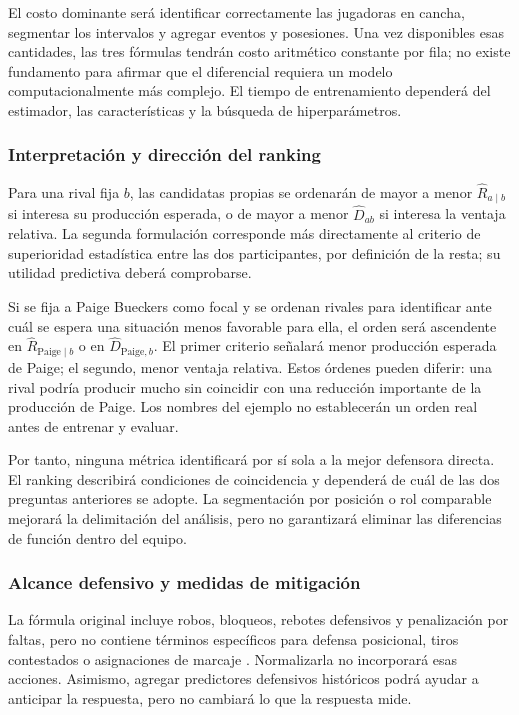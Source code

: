 El costo dominante será identificar correctamente las jugadoras en cancha, segmentar los intervalos y agregar eventos y posesiones. Una vez disponibles esas cantidades, las tres fórmulas tendrán costo aritmético constante por fila; no existe fundamento para afirmar que el diferencial requiera un modelo computacionalmente más complejo. El tiempo de entrenamiento dependerá del estimador, las características y la búsqueda de hiperparámetros.

\subsubsection*{Interpretación y dirección del ranking}
Para una rival fija $b$, las candidatas propias se ordenarán de mayor a menor $\widehat R_{a\mid b}$ si interesa su producción esperada, o de mayor a menor $\widehat D_{ab}$ si interesa la ventaja relativa. La segunda formulación corresponde más directamente al criterio de superioridad estadística entre las dos participantes, por definición de la resta; su utilidad predictiva deberá comprobarse.

Si se fija a Paige Bueckers como focal y se ordenan rivales para identificar ante cuál se espera una situación menos favorable para ella, el orden será ascendente en $\widehat R_{\mathrm{Paige}\mid b}$ o en $\widehat D_{\mathrm{Paige},b}$. El primer criterio señalará menor producción esperada de Paige; el segundo, menor ventaja relativa. Estos órdenes pueden diferir: una rival podría producir mucho sin coincidir con una reducción importante de la producción de Paige. Los nombres del ejemplo no establecerán un orden real antes de entrenar y evaluar.

Por tanto, ninguna métrica identificará por sí sola a la mejor defensora directa. El ranking describirá condiciones de coincidencia y dependerá de cuál de las dos preguntas anteriores se adopte. La segmentación por posición o rol comparable mejorará la delimitación del análisis, pero no garantizará eliminar las diferencias de función dentro del equipo.

\subsubsection*{Alcance defensivo y medidas de mitigación}
La fórmula original incluye robos, bloqueos, rebotes defensivos y penalización por faltas, pero no contiene términos específicos para defensa posicional, tiros contestados o asignaciones de marcaje \cite{basketballReferenceGameScore}. Normalizarla no incorporará esas acciones. Asimismo, agregar predictores defensivos históricos podrá ayudar a anticipar la respuesta, pero no cambiará lo que la respuesta mide.

